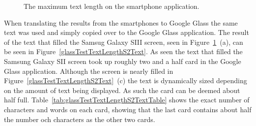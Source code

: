 	\begin{figure}[H]%
		\centering
   		 \qquad
   		 \qquad
		\caption{The maximum text length on the smartphone application.}
		\label{glassTestTextLengthRaw}
	\end{figure}

When translating the results from the smartphones to Google Glass the same text was used and simply copied over to the Google Glass application. The result of the text that filled the Samsug Galaxy SIII screen, seen in Figure~\ref{glassTestTextLengthRaw}~(a), can be seen in Figure~\ref{glassTestTextLengthS2Text}. As seen the text that filled the Samsung Galaxy SII screen took up roughly two and a half card in the Google Glass application. Although the screen is nearly filled in Figure~\ref{glassTestTextLengthS2Text}~(c) the text is dynamically sized depending on the amount of text being displayed. As such the card can be deemed about half full. Table~\ref{tab:glassTestTextLengthS2TextTable} shows the exact number of characters and words on each card, showing that the last card contains about half the number och characters as the other two cards.

